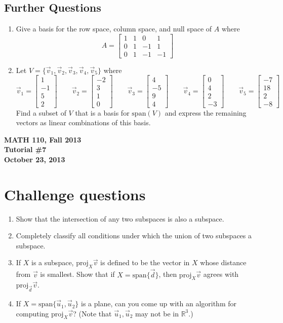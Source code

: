 \documentclass[11pt]{exam}
\newcommand{\R}{\mathbb{R}}
\newcommand{\proj}{\mathrm{proj}}
\newcommand{\mat}[1]{\begin{bmatrix}#1\end{bmatrix}}
\newcommand{\mthCourse}{MATH 110}
\newcommand{\mthTerm}{Fall 2013}
\newcommand{\mthTutorialNumber}{7}
\newcommand{\mthDate}{October 23, 2013}
\begin{document}
\subsection*{Further Questions}
\begin{enumerate}[resume]
	\item Give a basis for the row space, column space, and null space of $A$ where
		\[
			A=\mat{1&1&0&1\\0&1&-1&1\\0&1&-1&-1}
		\]
	\item Let $V=\{\vec v_1, \vec v_2, \vec v_3, \vec v_4, \vec v_5\}$
		where
		\[
			\vec v_1=\mat{1\\-1\\5\\2}\qquad
			\vec v_2=\mat{-2\\3\\1\\0}\qquad
			\vec v_3=\mat{4\\-5\\9\\4}\qquad
			\vec v_4=\mat{0\\4\\2\\-3}\qquad
			\vec v_5=\mat{-7\\18\\2\\-8}
		\]
		Find a subset of $V$ that is a
		basis for $\mathrm{span}( V)$ and express the remaining vectors as linear
		combinations of this basis.
\end{enumerate}




\newpage
{
	\begin{center}
		{\bf \mthCourse, \mthTerm}\\ 
		{\bf Tutorial \#\mthTutorialNumber}\\
		{\bf \mthDate}
	\end{center}
}

\section*{Challenge questions}

\begin{enumerate}[resume]
	\item Show that the intersection of any two subspaces is also a subspace.
	\item Completely classify all
		conditions under which the union of two subspaces a subspace.
	\item If $X$ is a subspace, $\proj_X\vec v$ is defined to be the vector
		in $X$ whose distance from $\vec v$ is smallest.
		Show that if $X=\mathrm{span}\{\vec d\}$, then $\proj_X \vec v$ agrees
		with $\proj_{\vec d}\vec v$.
	\item If $X=\mathrm{span}\{\vec u_1,\vec u_2\}$ is a plane, can you come up with an 
		algorithm for computing $\proj_X\vec v$?  (Note that $\vec u_1,
		\vec u_2$ may not be in $\R^3$.)

\end{enumerate}
\end{document}
